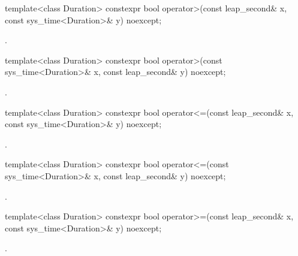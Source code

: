 %
%
\begin{itemdecl}
template<class Duration>
  constexpr bool operator>(const leap_second& x, const sys_time<Duration>& y) noexcept;
\end{itemdecl}

\begin{itemdescr}
\pnum
\returns
{}.
\end{itemdescr}

%
%
\begin{itemdecl}
template<class Duration>
  constexpr bool operator>(const sys_time<Duration>& x, const leap_second& y) noexcept;
\end{itemdecl}

\begin{itemdescr}
\pnum
\returns
{}.
\end{itemdescr}

%
%
\begin{itemdecl}
template<class Duration>
  constexpr bool operator<=(const leap_second& x, const sys_time<Duration>& y) noexcept;
\end{itemdecl}

\begin{itemdescr}
\pnum
\returns
{}.
\end{itemdescr}

%
%
\begin{itemdecl}
template<class Duration>
  constexpr bool operator<=(const sys_time<Duration>& x, const leap_second& y) noexcept;
\end{itemdecl}

\begin{itemdescr}
\pnum
\returns
{}.
\end{itemdescr}

%
%
\begin{itemdecl}
template<class Duration>
  constexpr bool operator>=(const leap_second& x, const sys_time<Duration>& y) noexcept;
\end{itemdecl}

\begin{itemdescr}
\pnum
\returns
{}.
\end{itemdescr}

